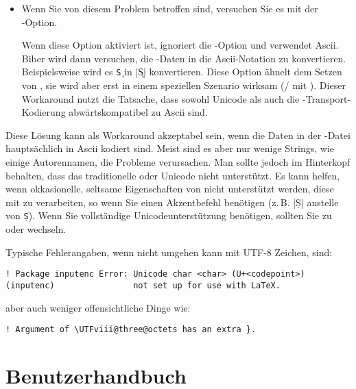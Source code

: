 \documentclass{ltxdockit}[2011/03/25]
\begin{document}
\begin{itemize}

\item Wenn Sie von diesem Problem betroffen sind, versuchen Sie es mit
der\\
-Option.

\begin{ltxexample} 
\usepackage[utf8]{inputenc}
\usepackage[safeinputenc]{biblatex} 
\end{ltxexample}
%
Wenn diese Option aktiviert ist, ignoriert  die -Option
und verwendet Ascii. Biber wird dann versuchen, die -Daten in die
Ascii-Notation zu konvertieren. Beispielsweise wird es \texttt{\k{S}} in |\k{S}|
konvertieren. Diese Option ähnelt dem Setzen von , sie
wird aber erst in einem speziellen Szenario wirksam (\slash
{} mit \utf). Dieser Workaround nutzt die Tatsache, dass sowohl
Unicode als auch die \utf-Transport-Kodierung abwärtskompatibel zu Ascii sind.

\end{itemize}

Diese Lösung kann als Workaround akzeptabel sein, wenn die Daten in der
-Datei hauptsächlich in Ascii kodiert sind. Meist sind es aber nur
wenige Strings, wie einige Autorennamen, die Probleme verursachen. Man sollte
jedoch im Hinterkopf behalten, dass das traditionelle \tex oder \pdftex Unicode
nicht unterstützt. Es kann helfen, wenn  okkasionelle, seltsame Eigenschaften
von  nicht unterstützt werden, diese mit \tex zu verarbeiten, so
wenn Sie einen Akzentbefehl benötigen (z.\,B. |\d{S}| anstelle von \texttt{\d{S}}).
Wenn Sie vollständige Unicodeunterstützung benötigen, sollten Sie zu  \xetex
oder \luatex wechseln.

Typische Fehlerangaben, wenn  nicht umgehen kann mit UTF-8 Zeichen, sind:

\begin{verbatim}
! Package inputenc Error: Unicode char <char> (U+<codepoint>)
(inputenc)                not set up for use with LaTeX.
\end{verbatim}
%
aber auch weniger offensichtliche Dinge wie:

\begin{verbatim}
! Argument of \UTFviii@three@octets has an extra }.
\end{verbatim}

\section{Benutzerhandbuch} \label{use}
\end{document}
